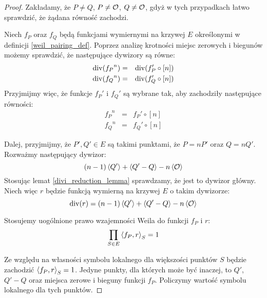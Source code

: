 \begin{proof}
Zakładamy, że $P \neq Q$, $P \neq \mathcal{O}$, $Q \neq \mathcal{O}$,
gdyż w tych przypadkach łatwo sprawdzić, że żądana równość zachodzi.

\noindent
Niech $f_P$ oraz $f_Q$ będą funkcjami wymiernymi na krzywej $E$
określonymi w definicji \ref{weil_pairing_def}.
Poprzez analizę krotności miejsc zerowych i biegunów możemy sprawdzić,
że następujące dywizory są równe:
\begin{eqnarray*}
\operatorname{div}({f_P}^n) & = & \operatorname{div}(f_P' \circ [n]) \\
\operatorname{div}({f_Q}^n) & = & \operatorname{div}(f_Q' \circ [n])
\end{eqnarray*}
Przyjmijmy więc, że funkcje $f_P'$ i $f_Q'$ są wybrane tak,
aby zachodziły następujące równości:
\begin{eqnarray*}
{f_P}^n & = & f_P' \circ [n] \\
{f_Q}^n & = & f_Q' \circ [n]
\end{eqnarray*}

\noindent
Dalej, przyjmijmy, że $P', Q' \in E$ są takimi punktami,
że $P = nP'$ oraz $Q = nQ'$.
Rozważmy następujący dywizor:
\begin{equation*}
(n-1)\left\langle Q'\right\rangle + \left\langle Q' - Q\right\rangle - n\left\langle\mathcal{O}\right\rangle
\end{equation*}
Stosując lemat \ref{divi_reduction_lemma} sprawdzamy,
że jest to dywizor główny.
Niech więc $r$ będzie funkcją wymierną na krzywej $E$ o takim dywizorze:
\begin{equation*}
\operatorname{div}(r) = (n-1)\left\langle Q'\right\rangle + \left\langle Q' - Q\right\rangle - n\left\langle\mathcal{O}\right\rangle
\end{equation*}

\noindent
Stosujemy uogólnione prawo wzajemności Weila do funkcji $f_P$ i $r$:
\begin{equation}\label{weil_reci_fp_r}
\prod_{S \in E} \left\langle f_P , r \right\rangle_{S} = 1
\end{equation}

\noindent
Ze względu na własności symbolu lokalnego dla większości punktów $S$
będzie zachodzić $\left\langle f_P , r \right\rangle_{S} = 1$.
Jedyne punkty, dla których może być inaczej,
to $Q'$, $Q' - Q$ oraz miejsca zerowe i bieguny funkcji $f_P$.
Policzymy wartość symbolu lokalnego dla tych punktów.


\end{proof}
